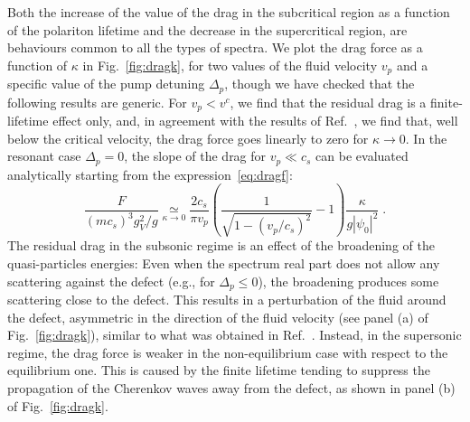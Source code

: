 Both the increase of the value of the drag in the subcritical region
as a function of the polariton lifetime and the decrease in the
supercritical region, are behaviours common to all the types of
spectra. We plot the drag force as a function of $\kappa$ in
Fig.~\ref{fig:dragk}, for two values of the fluid velocity $v_p$ and a
specific value of the pump detuning $\Delta_p$, though we have checked
that the following results are generic. For $v_p < v^c$, we find that
the residual drag is a finite-lifetime effect only, and, in agreement
with the results of Ref.~\cite{Cancellieri_2010}, we find that, well
below the critical velocity, the drag force goes linearly to zero for
$\kappa \to 0$. In the resonant case $\Delta_p=0$, the slope of the
drag for $v_p \ll c_s$ can be evaluated analytically starting from the
expression~\eqref{eq:dragf}:
%
\begin{equation*}
    \frac{F}{(mc_s)^3 g_V^2/g} \mathop{\simeq}\limits_{\kappa \to 0} \frac{2 c_s}{\pi
      v_p} \left( \frac{1}{ \sqrt{1-(v_p/c_s)^2}} - 1 \right)
    \frac{\kappa}{g |\psi_0|^2} \; .
\end{equation*}
%
The residual drag in the subsonic regime is an effect of the
broadening of the quasi-particles energies: Even when the spectrum
real part does not allow any scattering against the defect (e.g., for
$\Delta_p \le 0$), the broadening produces some scattering close to
the defect. This results in a perturbation of the fluid around the
defect, asymmetric in the direction of the fluid velocity (see panel
(a) of Fig.~\ref{fig:dragk}), similar to what  was obtained in
Ref.~\cite{Cancellieri_2010}. Instead, in the supersonic regime, the
drag force is weaker in the non-equilibrium case with respect to the
equilibrium one. This is caused by the finite lifetime tending to
suppress the propagation of the Cherenkov waves away from the defect,
as shown in panel (b) of Fig.~\ref{fig:dragk}.




